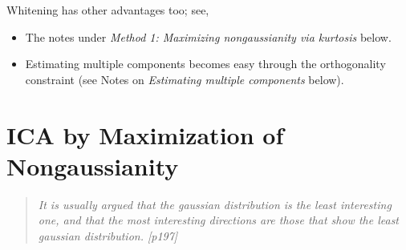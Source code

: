 \documentclass[a4paper]{book}
\begin{document}
\begin{itemize}
Whitening has other advantages too; see, \eg
	\begin{itemize}
	\item The notes under \textit{Method 1: Maximizing nongaussianity via kurtosis} below.
	\item Estimating multiple components becomes easy through the orthogonality constraint (see Notes on \textit{Estimating multiple components} below).
	\end{itemize}
\end{itemize}


\chapter{ICA by Maximization of Nongaussianity}


\begin{quotation}
\em It is usually argued that the gaussian distribution is the least interesting one, and that the most interesting directions are those that show the least gaussian distribution. [p197]
\end{quotation}
\end{document}
